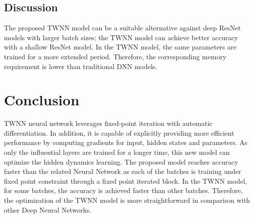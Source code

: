 \documentclass{article}
\begin{document}
\subsection{Discussion}
 The proposed TWNN model can be a suitable alternative against  deep ResNet models with larger batch sizes; the TWNN model can achieve better accuracy with a shallow ResNet model. In the TWNN model, the same parameters are trained for a more extended period. Therefore, the corresponding memory requirement is lower than traditional DNN models.
\section{Conclusion}
TWNN neural network leverages fixed-point iteration with automatic differentiation.  In addition, it is capable of explicitly providing more efficient performance by computing gradients for input, hidden states and parameters. As only the influential layers are trained for a longer time, this new model can optimize the hidden dynamics learning. The proposed model reaches accuracy faster than the related Neural Network as each of the batches is training under fixed point constraint through a fixed point iterated block. In the TWNN model, for some batches, the accuracy is achieved faster than other batches.  Therefore, the optimization of the TWNN model is more straightforward in comparison with other Deep Neural Networks.





\end{document}
